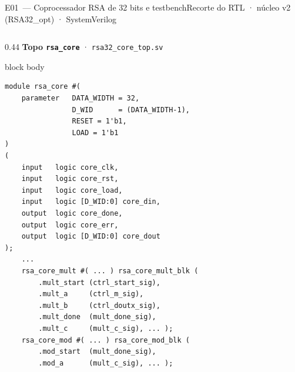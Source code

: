 \documentclass[aspectratio=169,10pt,t]{beamer}
\begin{document}
\begin{frame}[fragile]{E01~— Coprocessador RSA de 32 bits e testbench}{Recorte do RTL · núcleo v2 (RSA32\_opt) · SystemVerilog}
  \vspace*{-0.3cm}
  \begin{columns}[T]
    \begin{column}{0.44\textwidth}
      {\scriptsize\textbf{\color{tmCafe}Topo \texttt{rsa\_core}} · \texttt{rsa32\_core\_top.sv}}\\[0.05cm]
      \tiny
      \begin{beamercolorbox}[rounded=true,shadow=false,sep=3pt]{block body}
\vspace*{-0.6\baselineskip}
\fontsize{4.7}{5.5}\selectfont
\begin{verbatim}
module rsa_core #(
    parameter   DATA_WIDTH = 32,
                D_WID      = (DATA_WIDTH-1),
                RESET = 1'b1,
                LOAD = 1'b1
)
(
    input   logic core_clk,
    input   logic core_rst,
    input   logic core_load,
    input   logic [D_WID:0] core_din,
    output  logic core_done,
    output  logic core_err,
    output  logic [D_WID:0] core_dout
);
    ...
    rsa_core_mult #( ... ) rsa_core_mult_blk (
        .mult_start (ctrl_start_sig),
        .mult_a     (ctrl_m_sig),
        .mult_b     (ctrl_doutx_sig),
        .mult_done  (mult_done_sig),
        .mult_c     (mult_c_sig), ... );
    rsa_core_mod #( ... ) rsa_core_mod_blk (
        .mod_start  (mult_done_sig),
        .mod_a      (mult_c_sig), ... );


\end{verbatim}
\end{beamercolorbox}
\end{column}
\end{columns}
\end{frame}
\end{document}
